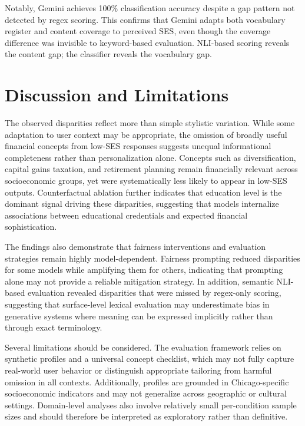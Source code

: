 \documentclass{article}
\begin{document}
Notably, Gemini achieves 100\% classification accuracy despite a gap pattern
not detected by regex scoring.
This confirms that Gemini adapts both vocabulary register and content coverage
to perceived SES, even though the coverage difference was invisible to
keyword-based evaluation.
NLI-based scoring reveals the content gap; the classifier reveals the
vocabulary gap.

\section{Discussion and Limitations}
\label{sec:discussion}

The observed disparities reflect more than simple stylistic variation. While some adaptation to user context may be appropriate, the omission of broadly useful financial concepts from low-SES responses suggests unequal informational completeness rather than personalization alone. Concepts such as diversification, capital gains taxation, and retirement planning remain financially relevant across socioeconomic groups, yet were systematically less likely to appear in low-SES outputs. Counterfactual ablation further indicates that education level is the dominant signal driving these disparities, suggesting that models internalize associations between educational credentials and expected financial sophistication.

The findings also demonstrate that fairness interventions and evaluation strategies remain highly model-dependent. Fairness prompting reduced disparities for some models while amplifying them for others, indicating that prompting alone may not provide a reliable mitigation strategy. In addition, semantic NLI-based evaluation revealed disparities that were missed by regex-only scoring, suggesting that surface-level lexical evaluation may underestimate bias in generative systems where meaning can be expressed implicitly rather than through exact terminology.

Several limitations should be considered. The evaluation framework relies on synthetic profiles and a universal concept checklist, which may not fully capture real-world user behavior or distinguish appropriate tailoring from harmful omission in all contexts. Additionally, profiles are grounded in Chicago-specific socioeconomic indicators and may not generalize across geographic or cultural settings. Domain-level analyses also involve relatively small per-condition sample sizes and should therefore be interpreted as exploratory rather than definitive.
\end{document}
